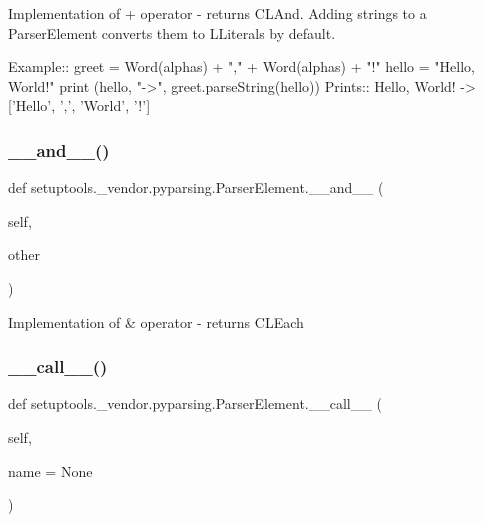 \begin{DoxyVerb}Implementation of + operator - returns C{L{And}}. Adding strings to a ParserElement
converts them to L{Literal}s by default.

Example::
    greet = Word(alphas) + "," + Word(alphas) + "!"
    hello = "Hello, World!"
    print (hello, "->", greet.parseString(hello))
Prints::
    Hello, World! -> ['Hello', ',', 'World', '!']
\end{DoxyVerb}
 \mbox{\label{classsetuptools_1_1__vendor_1_1pyparsing_1_1ParserElement_a5c86bc8ef351451455d2d026ced27a0a}} 
\subsubsection{\texorpdfstring{\+\_\+\+\_\+and\+\_\+\+\_\+()}{\_\_and\_\_()}}
{\footnotesize\ttfamily def setuptools.\+\_\+vendor.\+pyparsing.\+Parser\+Element.\+\_\+\+\_\+and\+\_\+\+\_\+ (\begin{DoxyParamCaption}\item[{}]{self,  }\item[{}]{other }\end{DoxyParamCaption})}

\begin{DoxyVerb}Implementation of & operator - returns C{L{Each}}
\end{DoxyVerb}
 \mbox{\label{classsetuptools_1_1__vendor_1_1pyparsing_1_1ParserElement_a7f154aa4d9339f88d2306325bf99b953}} 
\subsubsection{\texorpdfstring{\+\_\+\+\_\+call\+\_\+\+\_\+()}{\_\_call\_\_()}}
{\footnotesize\ttfamily def setuptools.\+\_\+vendor.\+pyparsing.\+Parser\+Element.\+\_\+\+\_\+call\+\_\+\+\_\+ (\begin{DoxyParamCaption}\item[{}]{self,  }\item[{}]{name = {\ttfamily None} }\end{DoxyParamCaption})}

